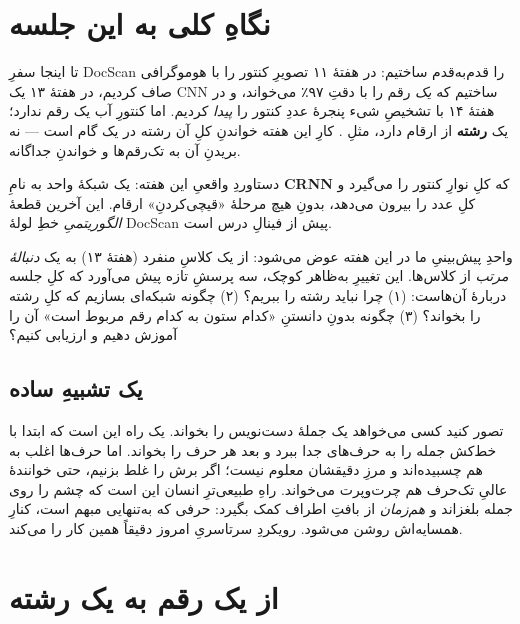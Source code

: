 \documentclass[12pt,a4paper]{article}
\begin{document}

\tableofcontents
\vspace{6pt}

\section{نگاهِ کلی به این جلسه}

تا اینجا سفرِ DocScan را قدم‌به‌قدم ساختیم: در هفتهٔ ۱۱ تصویرِ کنتور را با هوموگرافی صاف کردیم، در هفتهٔ ۱۳ یک CNN ساختیم که \emph{یک} رقم را با دقتِ ۹۷٪ می‌خواند، و در هفتهٔ ۱۴ با تشخیصِ شیء پنجرهٔ عددِ کنتور را \emph{پیدا} کردیم. اما کنتورِ آب یک رقم ندارد؛ یک \textbf{رشته} از ارقام دارد، مثلِ . کارِ این هفته خواندنِ کلِ آن رشته در یک گام است — نه بریدنِ آن به تک‌رقم‌ها و خواندنِ جداگانه.

\begin{yaddasht}
دستاوردِ واقعیِ این هفته: یک شبکهٔ واحد به نامِ \textbf{CRNN} که کلِ نوارِ کنتور را می‌گیرد و کلِ عدد را بیرون می‌دهد، بدونِ هیچ مرحلهٔ «قیچی‌کردنِ» ارقام. این آخرین قطعهٔ \emph{الگوریتمیِ} خطِ لولهٔ DocScan پیش از فینالِ درس است.
\end{yaddasht}

واحدِ پیش‌بینیِ ما در این هفته عوض می‌شود: از یک کلاسِ منفرد (هفتهٔ ۱۳) به یک \emph{دنبالهٔ مرتب} از کلاس‌ها. این تغییرِ به‌ظاهر کوچک، سه پرسشِ تازه پیش می‌آورد که کلِ جلسه دربارهٔ آن‌هاست: (۱) چرا نباید رشته را ببریم؟ (۲) چگونه شبکه‌ای بسازیم که کلِ رشته را بخواند؟ (۳) چگونه بدونِ دانستنِ «کدام ستون به کدام رقم مربوط است» آن را آموزش دهیم و ارزیابی کنیم؟

\subsection{یک تشبیهِ ساده}

تصور کنید کسی می‌خواهد یک جملهٔ دست‌نویس را بخواند. یک راه این است که ابتدا با خط‌کش جمله را به حرف‌های جدا ببرد و بعد هر حرف را بخواند. اما حرف‌ها اغلب به هم چسبیده‌اند و مرزِ دقیقشان معلوم نیست؛ اگر برش را غلط بزنیم، حتی خوانندهٔ عالیِ تک‌حرف هم چرت‌وپرت می‌خواند. راهِ طبیعی‌ترِ انسان این است که چشم را روی جمله بلغزاند و \emph{هم‌زمان} از بافتِ اطراف کمک بگیرد: حرفی که به‌تنهایی مبهم است، کنارِ همسایه‌اش روشن می‌شود. رویکردِ سرتاسریِ امروز دقیقاً همین کار را می‌کند.

\section{از یک رقم به یک رشته}
\end{document}
